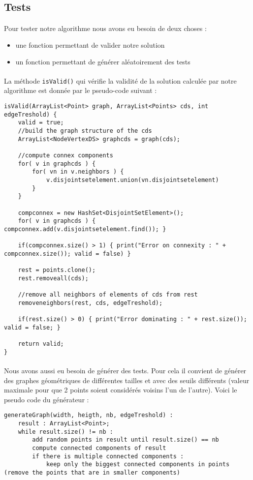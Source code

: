 \subsection{Tests}

\paragraph{}
Pour tester notre algorithme nous avons eu besoin de deux choses :
\begin{itemize}
\item une fonction permettant de valider notre solution
\item un fonction permettant de générer aléatoirement des tests
\end{itemize}

\paragraph{}
La méthode \verb?isValid()? qui vérifie la validité de la solution calculée par notre algorithme est donnée par le pseudo-code suivant :
\begin{lstlisting}
isValid(ArrayList<Point> graph, ArrayList<Points> cds, int edgeTreshold) {
	valid = true;
	//build the graph structure of the cds
	ArrayList<NodeVertexDS> graphcds = graph(cds);
	
	//compute connex components
	for( v in graphcds ) {
		for( vn in v.neighbors ) {
			v.disjointsetelement.union(vn.disjointsetelement)
		}
	}
	
	compconnex = new HashSet<DisjointSetElement>();
	for( v in graphcds ) { compconnex.add(v.disjointsetelement.find()); }
	
	if(compconnex.size() > 1) { print("Error on connexity : " + compconnex.size()); valid = false) }
	
	rest = points.clone();
	rest.removeall(cds);
	
	//remove all neighbors of elements of cds from rest
	removeneighbors(rest, cds, edgeTreshold);
	
	if(rest.size() > 0) { print("Error dominating : " + rest.size()); valid = false; }
	
	return valid;
}
\end{lstlisting}

\paragraph{}
Nous avons aussi eu besoin de générer des tests. Pour cela il convient de générer des graphes géométriques de différentes tailles et avec des seuils différents (valeur maximale pour que 2 points soient considérés voisins l'un de l'autre).
Voici le pseudo code du générateur :
\begin{lstlisting}
generateGraph(width, heigth, nb, edgeTreshold) :
	result : ArrayList<Point>;
	while result.size() != nb :
		add random points in result until result.size() == nb
		compute connected components of result
		if there is multiple connected components :
			keep only the biggest connected components in points (remove the points that are in smaller components)
\end{lstlisting}

